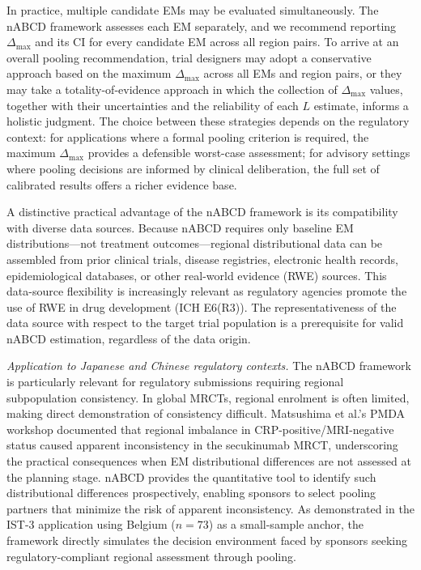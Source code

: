 \documentclass[AMA,Times1COL]{WileyNJDv5}
\begin{document}
In practice, multiple candidate EMs may be evaluated simultaneously. The nABCD framework assesses each EM separately, and we recommend reporting $\Delta_{\max}$ and its CI for every candidate EM across all region pairs. To arrive at an overall pooling recommendation, trial designers may adopt a conservative approach based on the maximum $\Delta_{\max}$ across all EMs and region pairs, or they may take a totality-of-evidence approach in which the collection of $\Delta_{\max}$ values, together with their uncertainties and the reliability of each $L$ estimate, informs a holistic judgment. The choice between these strategies depends on the regulatory context: for applications where a formal pooling criterion is required, the maximum $\Delta_{\max}$ provides a defensible worst-case assessment; for advisory settings where pooling decisions are informed by clinical deliberation, the full set of calibrated results offers a richer evidence base.

A distinctive practical advantage of the nABCD framework is its compatibility with diverse data sources. Because nABCD requires only baseline EM distributions---not treatment outcomes---regional distributional data can be assembled from prior clinical trials, disease registries, electronic health records, epidemiological databases, or other real-world evidence (RWE) sources. This data-source flexibility is increasingly relevant as regulatory agencies promote the use of RWE in drug development (ICH E6(R3)). The representativeness of the data source with respect to the target trial population is a prerequisite for valid nABCD estimation, regardless of the data origin.

\emph{Application to Japanese and Chinese regulatory contexts.} The nABCD framework is particularly relevant for regulatory submissions requiring regional subpopulation consistency.\cite{matsushima2024,song2025} In global MRCTs, regional enrolment is often limited, making direct demonstration of consistency difficult. Matsushima et al.'s\cite{matsushima2024} PMDA workshop documented that regional imbalance in CRP-positive/MRI-negative status caused apparent inconsistency in the secukinumab MRCT, underscoring the practical consequences when EM distributional differences are not assessed at the planning stage. nABCD provides the quantitative tool to identify such distributional differences prospectively, enabling sponsors to select pooling partners that minimize the risk of apparent inconsistency. As demonstrated in the IST-3 application using Belgium ($n=73$) as a small-sample anchor, the framework directly simulates the decision environment faced by sponsors seeking regulatory-compliant regional assessment through pooling.
\end{document}
